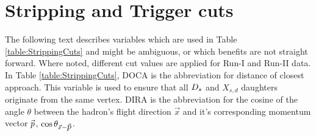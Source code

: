 
\section{Stripping and Trigger cuts}
\label{sec:StripAndTrigger}

The following text describes variables which are used in Table \ref{table:StrippingCuts} and might be ambiguous, or which benefits are not straight forward. 
Where noted, different cut values are applied for Run-I and Run-II data.
In Table \ref{table:StrippingCuts}, DOCA is the abbreviation for distance of closest approach. This variable is used to ensure that all ${{D}_{s}}$ and $X_{s,d}$ daughters originate from the same vertex.
DIRA is the abbreviation for the cosine of the angle $\theta$ between the hadron's flight direction $\vec{x}$ and it's corresponding momentum vector $\vec{\mbox{$p$}}$, $\cos{\theta_{\vec{x} -\vec{\mbox{$p$}}}}$.
